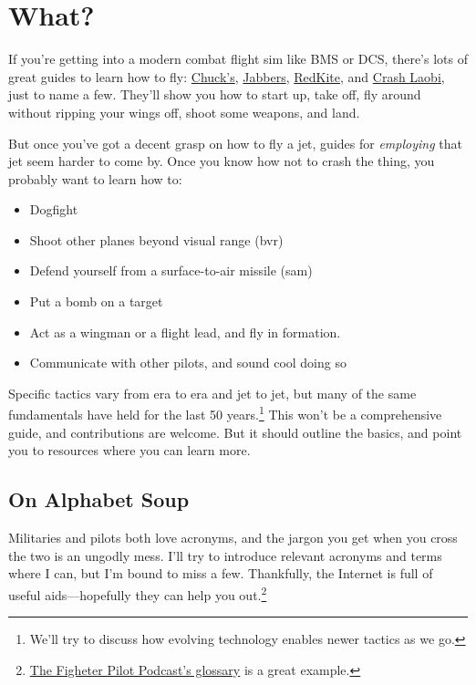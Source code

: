 \chapter{What?}

If you're getting into a modern combat flight sim like BMS or DCS,
there's lots of great guides to learn how to fly:
\href{https://www.mudspike.com/chucks-guides/}{Chuck's},
\href{https://www.youtube.com/channel/UCvXXUrGCF3wV3bbZ6pFQ00g}{Jabbers},
\href{https://www.youtube.com/user/RedKiteRender}{RedKite},
and
\href{https://www.youtube.com/channel/UCqH078Ef0HENo01LF3xwIvA}{Crash Laobi},
just to name a few.
They'll show you how to start up, take off, fly around
without ripping your wings off, shoot some weapons, and land.

But once you've got a decent grasp on how to fly a jet,
guides for \emph{employing} that jet seem harder to come by.
Once you know how not to crash the thing, you probably want to learn how to:
\begin{itemize}
\item Dogfight
\item Shoot other planes beyond visual range \ac{(bvr)}
\item Defend yourself from a surface-to-air missile \ac{(sam)}
\item Put a bomb on a target
\item Act as a wingman or a flight lead, and fly in formation.
\item Communicate with other pilots, and sound cool doing so
\end{itemize}

Specific tactics vary from era to era and jet to jet,
but many of the same fundamentals have held for the last 50
years.\punckern\footnote{We'll try to discuss how evolving technology
enables newer tactics as we go.}
This won't be a comprehensive guide,
and contributions are welcome.
But it should outline the basics, and point you to resources where you can
learn more.

\section{On Alphabet Soup}

Militaries and pilots both love acronyms,
and the jargon you get when you cross the two is an ungodly mess.
I'll try to introduce relevant acronyms and terms where I can,
but I'm bound to miss a few.
Thankfully, the Internet is full of useful aids---hopefully they can help you
out.\punckern\footnote{%
\href{https://www.fighterpilotpodcast.com/glossary/}{The Figheter Pilot Podcast's glossary}
is a great example.}
